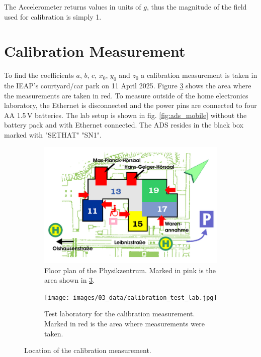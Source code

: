 The Accelerometer returns values in units of $g$, thus the magnitude of the field used for calibration is simply 1.

\section{Calibration Measurement \label{sec:da:calibration_meas}}
To find the coefficients $a$, $b$, $c$, $x_0$, $y_0$ and $z_0$ a calibration measurement is taken in the \ac{IEAP}'s courtyard/car park on 11 April 2025. Figure \ref{fig:test_lab} shows the area where the measurements are taken in red. To measure outside of the home electronics laboratory, the Ethernet is disconnected and the power pins are connected to four AA 1.5\,V batteries. The lab setup is shown in fig. \ref{fig:ads_mobile} without the battery pack and with Ethernet connected. The \ac{ADS} resides in the black box marked with "SETHAT" "SN1". 

\begin{figure}[h]
    \begin{subfigure}[t]{.5\textwidth}
        \centering
        \includegraphics[width=0.9\linewidth]{images/03_data/lageplan Physikzentrum.png}
        \caption[Floor plan of the Physikzentrum.]{Floor plan of the Physikzentrum. Marked in pink is the area shown in \ref{fig:test_lab}.}
        \label{fig:lageplan_physikzentrum}
    \end{subfigure}
    \begin{subfigure}[t]{.5\textwidth}
    \centering
    \texttt{[image: images/03\_data/calibration\_test\_lab.jpg]}
    \caption[Test laboratory for the calibration measurement.]{Test laboratory for the calibration measurement. Marked in red is the area where measurements were taken.}
    \label{fig:test_lab}
    \end{subfigure}
    \caption{Location of the calibration measurement.}
\end{figure}

